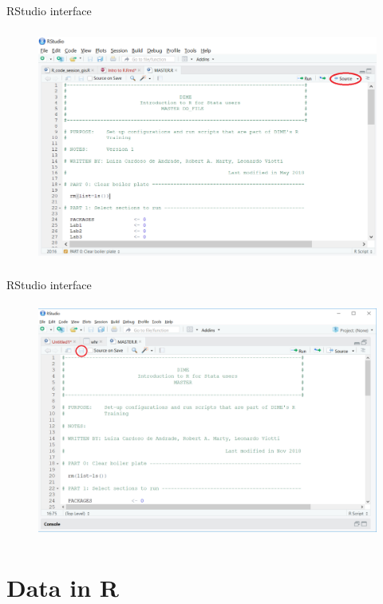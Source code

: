 \documentclass[ignorenonframetext,]{beamer}
\begin{document}
\begin{frame}{RStudio interface}

\begin{figure}
\centering
  \includegraphics[width=12cm,height=7.7cm]{img/scritpt3.png}
\end{figure}

\end{frame}

\begin{frame}{RStudio interface}

\begin{figure}
\centering
  \includegraphics[width=12cm,height=7.7cm]{img/scritpt4.png}
\end{figure}

\end{frame}

\section{Data in R}\label{data-in-r}
\end{document}
